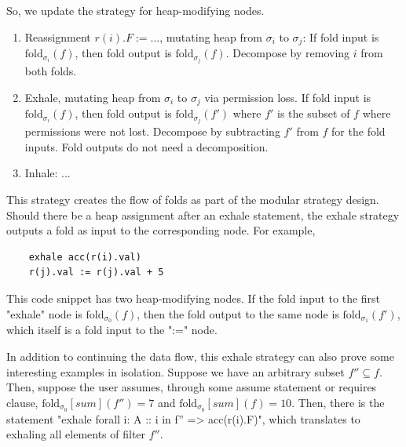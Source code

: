 \documentclass[msc,oneside]{ubcthesis}
\theoremstyle{definition}
\begin{document}
So, we update the strategy for heap-modifying nodes.
\begin{enumerate}
    \item Reassignment $r(i).F := ...$, mutating heap from $\sigma_i$ to $\sigma_j$: 
    If fold input is $\textrm{fold}_{\sigma_i}(f)$, then fold output is $\textrm{fold}_{\sigma_j}(f)$. 
    Decompose by removing $i$ from both folds.
    \item Exhale, mutating heap from $\sigma_i$ to $\sigma_j$ via permission loss. If fold input is $\textrm{fold}_{\sigma_i}(f)$, then fold output is $\textrm{fold}_{\sigma_j}(f')$ where $f'$ is the subset of $f$ where permissions were not lost. Decompose by subtracting $f'$ from $f$ for the fold inputs. Fold outputs do not need a decomposition.
    \item Inhale: ...
\end{enumerate}

This strategy creates the flow of folds as part of the modular strategy design. Should there be a heap assignment after an exhale statement, the exhale strategy outputs a fold as input to the corresponding node. For example,
\begin{lstlisting}
    exhale acc(r(i).val)
    r(j).val := r(j).val + 5
\end{lstlisting}
This code snippet has two heap-modifying nodes. If the fold input to the first "exhale" node is $\textrm{fold}_{\sigma_0}(f)$, then the fold output to the same node is $\textrm{fold}_{\sigma_1}(f')$, which itself is a fold input to the ":=" node.

In addition to continuing the data flow, this exhale strategy can also prove some interesting examples in isolation. Suppose we have an arbitrary subset $f'' \subseteq f$. Then, suppose the user assumes, through some assume statement or requires clause, $\textrm{fold}_{\sigma_0}[\textit{sum}](f'') = 7$ and $\textrm{fold}_{\sigma_0}[\textit{sum}](f) = 10$. Then, there is the statement 
"exhale forall i: A :: i in f'' => acc(r(i).F)", which translates to exhaling all elements of filter $f''$. 
\end{document}
